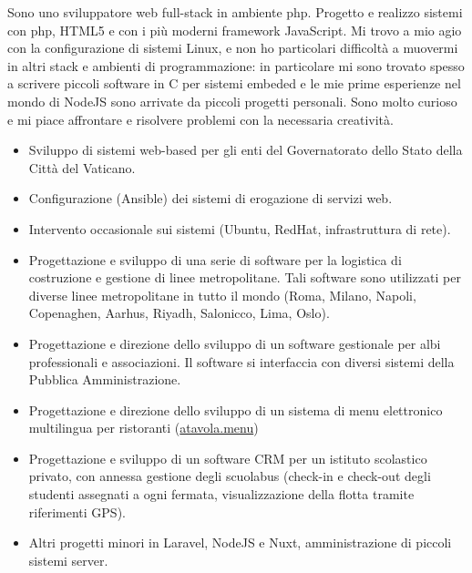 \documentclass[10pt,a4paper]{altacv}
\begin{document}

\begin{fullwidth}
\makecvheader
\end{fullwidth}

Sono uno sviluppatore web full-stack in ambiente php. Progetto e realizzo sistemi con php, HTML5 e con i più moderni framework JavaScript. Mi trovo a mio agio con la configurazione di sistemi Linux, e non ho particolari difficoltà a muovermi in altri stack e ambienti di programmazione: in particolare mi sono trovato spesso a scrivere piccoli software in C per sistemi embeded e le mie prime esperienze nel mondo di NodeJS sono arrivate da piccoli progetti personali. Sono molto curioso e mi piace affrontare e risolvere problemi con la necessaria creatività.


\begin{itemize}
\item Sviluppo di sistemi web-based per gli enti del Governatorato dello Stato della Città del Vaticano.
\item Configurazione (Ansible) dei sistemi di erogazione di servizi web.
\item Intervento occasionale sui sistemi (Ubuntu, RedHat, infrastruttura di rete).
\end{itemize}

\divider

\begin{itemize}
\item Progettazione e sviluppo di una serie di software per la logistica di costruzione e gestione di linee metropolitane. Tali software sono utilizzati per diverse linee metropolitane in tutto il mondo (Roma, Milano, Napoli, Copenaghen, Aarhus, Riyadh, Salonicco, Lima, Oslo).
\item Progettazione e direzione dello sviluppo di un software gestionale per albi professionali e associazioni. Il software si interfaccia con diversi sistemi della Pubblica Amministrazione.
\item Progettazione e direzione dello sviluppo di un sistema di menu elettronico multilingua per ristoranti (\href{https://atavola.menu}{atavola.menu})
\item Progettazione e sviluppo di un software CRM per un istituto scolastico privato, con annessa gestione degli scuolabus (check-in e check-out degli studenti assegnati a ogni fermata, visualizzazione della flotta tramite riferimenti GPS).
\item Altri progetti minori in Laravel, NodeJS e Nuxt, amministrazione di piccoli sistemi server.
\end{itemize}
\end{document}
